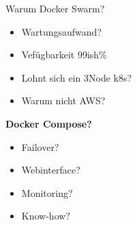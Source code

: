\documentclass[10pt, unknownkeysallowed]{beamer}
\begin{document}
\begin{frame}{Warum Docker Swarm?}
\begin{minipage}{.45\textwidth}
\begin{itemize}
	    \item Wartungsaufwand?
		\item Vefügbarkeit 99ish\%
		\item Lohnt sich ein 3Node k8s?
		\item Warum nicht AWS?
	\end{itemize}
	\textbf{Docker Compose?}
	\begin{itemize}
	    \item Failover?
		\item Webinterface?
		\item Monitoring?
		\item Know-how?
	\end{itemize}
    \vspace*{-10px}
\end{minipage}
\end{frame}
\end{document}
